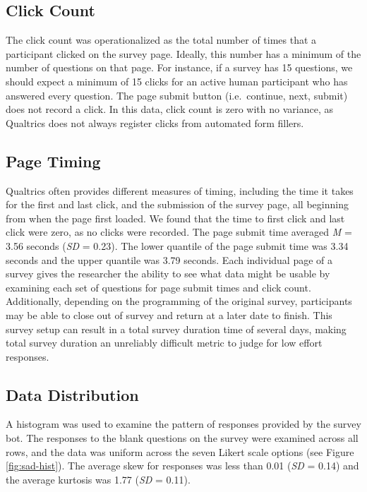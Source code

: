 \documentclass[english,man]{apa6}
\theoremstyle{definition}
\theoremstyle{definition}
\theoremstyle{definition}
\theoremstyle{remark}
\begin{document}
\subsection{Click Count}\label{click-count}

The click count was operationalized as the total number of times that a
participant clicked on the survey page. Ideally, this number has a
minimum of the number of questions on that page. For instance, if a
survey has 15 questions, we should expect a minimum of 15 clicks for an
active human participant who has answered every question. The page
submit button (i.e.~continue, next, submit) does not record a click. In
this data, click count is zero with no variance, as Qualtrics does not
always register clicks from automated form fillers.

\subsection{Page Timing}\label{page-timing}

Qualtrics often provides different measures of timing, including the
time it takes for the first and last click, and the submission of the
survey page, all beginning from when the page first loaded. We found
that the time to first click and last click were zero, as no clicks were
recorded. The page submit time averaged \emph{M} = 3.56 seconds
(\emph{SD} = 0.23). The lower quantile of the page submit time was 3.34
seconds and the upper quantile was 3.79 seconds. Each individual page of
a survey gives the researcher the ability to see what data might be
usable by examining each set of questions for page submit times and
click count. Additionally, depending on the programming of the original
survey, participants may be able to close out of survey and return at a
later date to finish. This survey setup can result in a total survey
duration time of several days, making total survey duration an
unreliably difficult metric to judge for low effort responses.

\subsection{Data Distribution}\label{data-distribution}

A histogram was used to examine the pattern of responses provided by the
survey bot. The responses to the blank questions on the survey were
examined across all rows, and the data was uniform across the seven
Likert scale options (see Figure \ref{fig:sad-hist}). The average skew
for responses was less than 0.01 (\emph{SD} = 0.14) and the average
kurtosis was 1.77 (\emph{SD} = 0.11).
\end{document}

